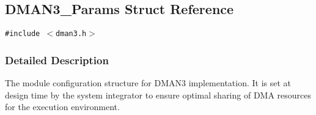 \hypertarget{struct_d_m_a_n3___params}{
\subsection{DMAN3\_\-Params Struct Reference}
\label{struct_d_m_a_n3___params}
}
{\tt \#include $<$dman3.h$>$}



\subsubsection{Detailed Description}
The module configuration structure for DMAN3 implementation. It is set at design time by the system integrator to ensure optimal sharing of DMA resources for the execution environment. 



